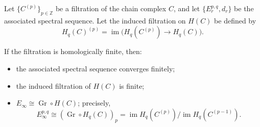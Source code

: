 Let $\{C^{(p)}\}_{p \in \mathbb{Z}}$ be a filtration of the chain complex $C$, and let $\{E_r^{p,q}, d_r\}$ be the associated spectral sequence. Let the induced filtration on $H(C)$ be defined by
\[
H_q(C)^{(p)} = \operatorname{im}\bigl(H_q(C^{(p)}) \to H_q(C)\bigr).
\]

If the filtration is homologically finite, then:
\begin{itemize}
\item[(i)] the associated spectral sequence converges finitely;
\item[(ii)] the induced filtration of $H(C)$ is finite;
\item[(iii)] $E_\infty \cong \operatorname{Gr} \circ H(C)$; precisely,
\[
E_\infty^{p,q} \cong (\operatorname{Gr} \circ H_q(C))_p = \operatorname{im} H_q(C^{(p)}) / \operatorname{im} H_q(C^{(p-1)}).
\]
\end{itemize}
